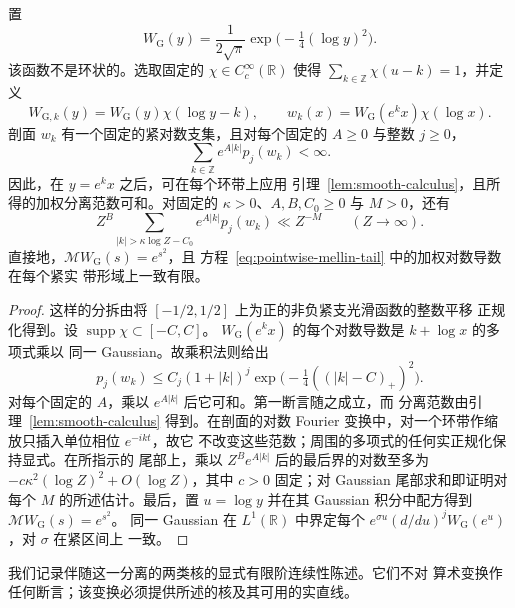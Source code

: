 \begin{lemma}\label{lem:gaussian-annular}
置
\[
 W_{\mathrm G}(y)=\frac1{2\sqrt\pi}
                         \exp\bigl(-\tfrac14(\log y)^2\bigr).
\]
该函数不是环状的。选取固定的 $\chi\in C_c^\infty(\mathbb R)$
使得 $\sum_{k\in\mathbb Z}\chi(u-k)=1$，并定义
\[
 W_{{\mathrm G},k}(y)=W_{\mathrm G}(y)\chi(\log y-k),\qquad
 w_k(x)=W_{\mathrm G}(e^k x)\chi(\log x).
\]
剖面 $w_k$ 有一个固定的紧对数支集，且对每个固定的 $A\ge0$ 与整数
$j\ge0$，
\begin{equation}\label{eq:gaussian-annular-sum}
 \sum_{k\in\mathbb Z}e^{A|k|}p_j(w_k)<\infty.
\end{equation}
因此，在 $y=e^k x$ 之后，可在每个环带上应用
引理~\ref{lem:smooth-calculus}，且所得的加权分离范数可和。对固定的
$\kappa>0$、$A,B,C_0\ge0$ 与 $M>0$，还有
\[
 Z^B\sum_{|k|>\kappa\log Z-C_0}e^{A|k|}p_j(w_k)\ll Z^{-M}
       \qquad(Z\to\infty).
\]
直接地，$\mathcal MW_{\mathrm G}(s)=e^{s^2}$，且
方程~\eqref{eq:pointwise-mellin-tail} 中的加权对数导数在每个紧实
带形域上一致有限。
\end{lemma}

\begin{proof}
这样的分拆由将 $[-1/2,1/2]$ 上为正的非负紧支光滑函数的整数平移
正规化得到。设 $\operatorname{supp}\chi\subset[-C,C]$。
$W_{\mathrm G}(e^k x)$ 的每个对数导数是 $k+\log x$ 的多项式乘以
同一 Gaussian。故乘积法则给出
\[
 p_j(w_k)\le C_j(1+|k|)^j
             \exp\bigl(-\tfrac14((|k|-C)_+)^2\bigr).
\]
对每个固定的 $A$，乘以 $e^{A|k|}$ 后它可和。第一断言随之成立，而
分离范数由引理~\ref{lem:smooth-calculus} 得到。在剖面的对数
Fourier 变换中，对一个环带作缩放只插入单位相位 $e^{-ikt}$，故它
不改变这些范数；周围的多项式的任何实正规化保持显式。在所指示的
尾部上，乘以 $Z^Be^{A|k|}$ 后的最后界的对数至多为
$-c\kappa^2(\log Z)^2+O(\log Z)$，其中 $c>0$ 固定；对 Gaussian
尾部求和即证明对每个 $M$ 的所述估计。最后，置 $u=\log y$ 并在其
Gaussian 积分中配方得到 $\mathcal MW_{\mathrm G}(s)=e^{s^2}$。
同一 Gaussian 在 $L^1(\mathbb R)$ 中界定每个
$e^{\sigma u}(d/du)^jW_{\mathrm G}(e^u)$，对 $\sigma$ 在紧区间上
一致。
\end{proof}

我们记录伴随这一分离的两类核的显式有限阶连续性陈述。它们不对
算术变换作任何断言；该变换必须提供所述的核及其可用的实直线。

